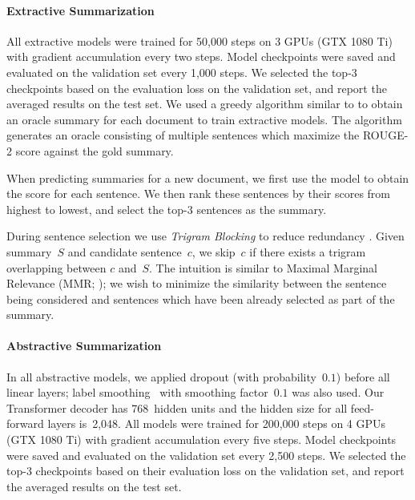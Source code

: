 \documentclass[11pt,a4paper]{article}
\begin{document}
    
    \paragraph{Extractive Summarization}
    All extractive models were trained for 50,000 steps on 3 GPUs (GTX
    1080 Ti) with gradient accumulation every two steps.  Model
    checkpoints were saved and evaluated on the validation set every
    1,000 steps. We selected the top-3 checkpoints based on the
    evaluation loss on the validation set, and report the averaged
    results on the test set.    
    We used a greedy
    algorithm similar to \citet{nallapati2017summarunner} to obtain an
    oracle summary for each document to train extractive models. The algorithm generates an oracle
    consisting of multiple sentences which maximize the ROUGE-2 score
    against the gold summary. 
    
    
    When predicting summaries for a new document, we first use the
    model to obtain the score for each sentence.  We then rank these
    sentences by their scores from highest to lowest, and select the
    top-3 sentences as the summary.
    
    During sentence selection we use \textit{Trigram Blocking} to
    reduce redundancy \cite{paulus2017deep}.  Given summary~$S$ and
    candidate sentence~$c$, we skip~$c$ if there exists a trigram
    overlapping between $c$ and~$S$. The intuition is similar to
    Maximal Marginal Relevance (MMR; \citealt{carbonell1998use}); we
    wish to minimize the similarity between the sentence being
    considered and sentences which have been already selected as part
    of the summary.
    
    \paragraph{Abstractive Summarization}
    In all abstractive models, we applied dropout (with
    probability~$0.1$) before all linear layers; label
    smoothing~\citep{szegedy2016rethinking} with smoothing
    factor~$0.1$ was also used.  Our Transformer decoder has
    768~hidden units and the hidden size for all feed-forward layers
    is~2,048.  All models were trained for 200,000 steps on 4 GPUs
    (GTX 1080 Ti) with gradient accumulation every five steps.  Model
    checkpoints were saved and evaluated on the validation set every
    2,500 steps. We selected the top-3 checkpoints based on their
    evaluation loss on the validation set, and report the averaged
    results on the test set.
    
\end{document}
